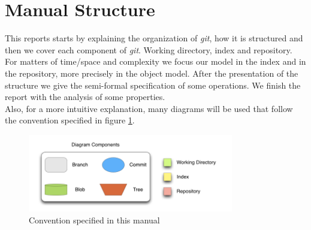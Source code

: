 \section{Manual Structure}
This reports starts by explaining the organization of \emph{git}, how
it is structured and then we cover each component of \emph{git}. 
Working directory, index and repository. For matters
of time/space and complexity we focus our model in the index and in the
repository, more precisely in the object model. 
After the presentation of the structure we give the semi-formal
specification of some operations. We finish the report with the
analysis of some properties. \\
Also, for a more intuitive explanation, many diagrams will be used that follow
the convention specified in figure \ref{fig:notation}. 
\begin{figure}[tp]
   \centering
   \includegraphics[width=0.8\textwidth]{images/Legenda.png}
   \caption{Convention specified in this manual}
   \label{fig:notation}
\end{figure}

